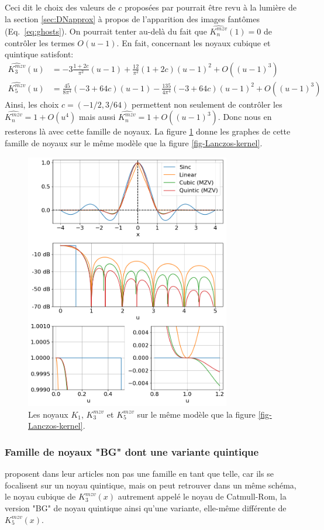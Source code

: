 \documentclass[11pt,twoside]{article}
\newcommand{\nn}{\nonumber}
\begin{document}
Ceci dit le choix des valeurs de $c$ proposées par \cite{Meijering1999} pourrait être revu à la lumière de la section \ref{sec:DNapprox} à propos de l'apparition des images fantômes (Eq.~\ref{eq:ghosts}). On pourrait tenter au-delà du fait que $\widehat{K^{mzv}_n}(1)=0$ de contrôler les termes $O(u-1)$. En fait, concernant les noyaux cubique et quintique satisfont:
\begin{align}
\widehat{K^{mzv}_3}(u) &= -3\frac{1+2c}{\pi^2} (u-1) + \frac{12}{\pi^2}(1+2c)(u-1)^2 + O((u-1)^3) \nn\\
\widehat{K^{mzv}_5}(u) &= \frac{45}{8\pi^4}(-3+64c) (u-1) -\frac{135}{4\pi^4}(-3+64c) (u-1)^2 + O((u-1)^3)
\end{align}
Ainsi, les choix $c=(-1/2,3/64)$ permettent non seulement de contrôler les $\widehat{K^{mzv}_n}=1+O(u^4)$ mais aussi $\widehat{K^{mzv}_n}=1+O((u-1)^3)$. Donc nous en resterons là avec cette famille de noyaux. La figure \ref{fig-mzv-kernel} donne les graphes de cette famille de noyaux sur le même modèle que la figure \ref{fig-Lanczos-kernel}. 
\begin{figure}
\centering
\includegraphics[width=0.8\textwidth]{fig6.png}
\caption{Les noyaux $K_1$, $K^{mzv}_3$ et $K^{mzv}_5$ sur le même modèle que la figure \ref{fig-Lanczos-kernel}.}
\label{fig-mzv-kernel}
\end{figure}
%
\subsubsection{Famille de noyaux "BG" dont une variante quintique}
\label{sec:BGKernels}
% 
\cite{2014PASP..126..287B} proposent dans leur articles non pas une famille en tant que telle, car ils se focalisent sur un noyau quintique, mais on peut retrouver dans un même schéma, le noyau cubique de $K^{mzv}_3(x)$ autrement appelé le noyau de Catmull-Rom,  la version "BG" de noyau quintique ainsi qu'une variante, elle-même différente de $K^{mzv}_5(x)$.
\end{document}
